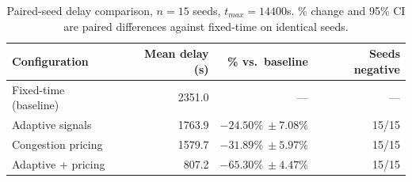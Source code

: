 \begin{table}[htbp]
\centering
\caption{Paired-seed delay comparison, $n=15$ seeds, $t_{max}=14400$s. \% change and 95\% CI are paired differences against fixed-time on identical seeds.}
\label{tab:core}
\begin{tabular}{lrrr}
\hline
Configuration & Mean delay (s) & \% vs.\ baseline & Seeds negative \\
\hline
Fixed-time (baseline) & 2351.0 & --- & --- \\
Adaptive signals & 1763.9 & $-24.50\%\ \pm 7.08\%$ & 15/15 \\
Congestion pricing & 1579.7 & $-31.89\%\ \pm 5.97\%$ & 15/15 \\
Adaptive + pricing & 807.2 & $-65.30\%\ \pm 4.47\%$ & 15/15 \\
\hline
\end{tabular}
\end{table}
